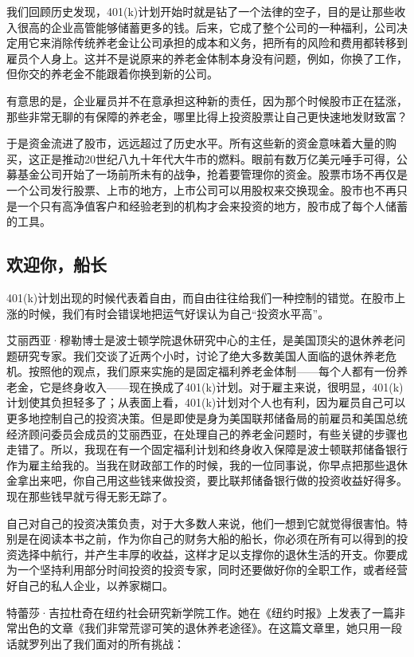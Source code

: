 我们回顾历史发现，401(k)计划开始时就是钻了一个法律的空子，目的是让那些收入很高的企业高管能够储蓄更多的钱。后来，它成了整个公司的一种福利，公司决定用它来消除传统养老金让公司承担的成本和义务，把所有的风险和费用都转移到雇员个人身上。这并不是说原来的养老金体制本身没有问题，例如，你换了工作，但你交的养老金不能跟着你换到新的公司。

有意思的是，企业雇员并不在意承担这种新的责任，因为那个时候股市正在猛涨，那些非常无聊的有保障的养老金，哪里比得上投资股票让自己更快速地发财致富？

于是资金流进了股市，远远超过了历史水平。所有这些新的资金意味着大量的购买，这正是推动20世纪八九十年代大牛市的燃料。眼前有数万亿美元唾手可得，公募基金公司开始了一场前所未有的战争，抢着要管理你的资金。股票市场不再仅是一个公司发行股票、上市的地方，上市公司可以用股权来交换现金。股市也不再只是一个只有高净值客户和经验老到的机构才会来投资的地方，股市成了每个人储蓄的工具。

\subsection{欢迎你，船长}

401(k)计划出现的时候代表着自由，而自由往往给我们一种控制的错觉。在股市上涨的时候，我们有时会错误地把运气好误认为自己“投资水平高”。

艾丽西亚·穆勒博士是波士顿学院退休研究中心的主任，是美国顶尖的退休养老问题研究专家。我们交谈了近两个小时，讨论了绝大多数美国人面临的退休养老危机。按照他的观点，我们原来实施的是固定福利养老金体制——每个人都有一份养老金，它是终身收入——现在换成了401(k)计划。对于雇主来说，很明显，401(k)计划使其负担轻多了；从表面上看，401(k)计划对个人也有利，因为雇员自己可以更多地控制自己的投资决策。但是即使是身为美国联邦储备局的前雇员和美国总统经济顾问委员会成员的艾丽西亚，在处理自己的养老金问题时，有些关键的步骤也走错了。所以，我现在有一个固定福利计划和终身收入保障是波士顿联邦储备银行作为雇主给我的。当我在财政部工作的时候，我的一位同事说，你早点把那些退休金拿出来吧，你自己用这些钱来做投资，要比联邦储备银行做的投资收益好得多。现在那些钱早就亏得无影无踪了。

自己对自己的投资决策负责，对于大多数人来说，他们一想到它就觉得很害怕。特别是在阅读本书之前，作为你自己的财务大船的船长，你必须在所有可以得到的投资选择中航行，并产生丰厚的收益，这样才足以支撑你的退休生活的开支。你要成为一个坚持利用部分时间投资的投资专家，同时还要做好你的全职工作，或者经营好自己的私人企业，以养家糊口。

特蕾莎·吉拉杜奇在纽约社会研究新学院工作。她在《纽约时报》上发表了一篇非常出色的文章《我们非常荒谬可笑的退休养老途径》。在这篇文章里，她只用一段话就罗列出了我们面对的所有挑战：

